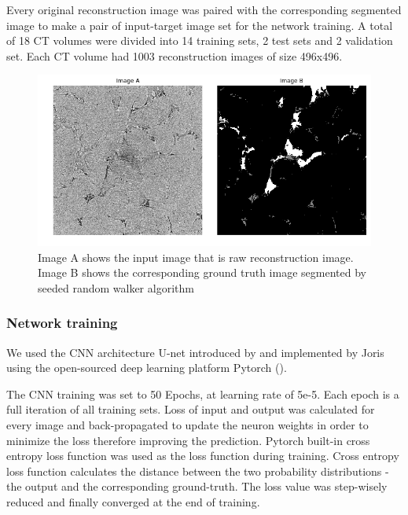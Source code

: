 \documentclass[draft,linenumbers]{agujournal2018}
\begin{document}
Every original reconstruction image was paired with the corresponding segmented image to make a pair of input-target image set for the network training. A total of 18 CT volumes were divided into 14 training sets, 2 test sets and 2 validation set. Each CT volume had 1003 reconstruction images of size 496x496.  
 \
 \begin{figure}[h]
 \centering
 \includegraphics[width=33pc]{imgs/17_test_original.png}
 \caption{Image A shows the input image that is raw reconstruction image. Image B shows the corresponding ground truth image segmented by seeded random walker algorithm}
 \label{fig1}
 \end{figure}
 
\subsubsection{Network training}
We used the CNN architecture U-net introduced by \citet{ronneberger2015u} and implemented by Joris \citet{Jorispytorch} using the open-sourced deep learning platform Pytorch (\citet{paszke2017automatic}). 

The CNN training was set to 50 Epochs, at learning rate of 5e-5. Each epoch is a full iteration of all training sets. Loss of input and output was calculated for every image and back-propagated to update the neuron weights in order to  minimize the loss therefore improving the prediction. Pytorch built-in cross entropy loss function was used as the loss function during training. Cross entropy loss function calculates the distance between the two probability distributions - the output and the corresponding ground-truth. The loss value was step-wisely reduced and finally converged at the end of training. 

\end{document}
